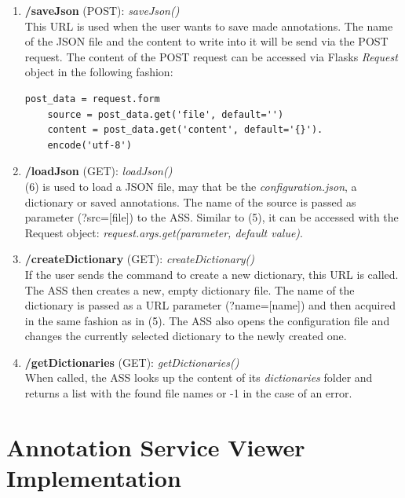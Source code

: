 \begin{enumerate}[(1) -]
	\item \textbf{/saveJson} (POST): \emph{saveJson()}\\
	This URL is used when the user wants to save made annotations. The name of the JSON file and the content to write into it will be send via the POST request. The content of the POST request can be accessed via Flasks \emph{Request} object\cite{web:flask} in the following fashion:
	\begin{lstlisting}[frame=single]
	post_data = request.form
	source = post_data.get('file', default='')
	content = post_data.get('content', default='{}').
	encode('utf-8')
	\end{lstlisting}
	
	\item \textbf{/loadJson} (GET): \emph{loadJson()}\\
	(6) is used to load a JSON file, may that be the \emph{configuration.json}, a dictionary or saved annotations. The name of the source is passed as parameter (?src=[file]) to the ASS. Similar to (5), it can be accessed with the Request object\cite{web:flask}: \emph{request.args.get(parameter, default value)}.
	
	\item \textbf{/createDictionary} (GET): \emph{createDictionary()}\\
	If the user sends the command to create a new dictionary, this URL is called. The ASS then creates a new, empty dictionary file. The name of the dictionary is passed as a URL parameter (?name=[name]) and then acquired in the same fashion as in (5). The ASS also opens the configuration file and changes the currently selected dictionary to the newly created one.
	
	\item \textbf{/getDictionaries} (GET): \emph{getDictionaries()}\\
	When called, the ASS looks up the content of its \emph{dictionaries} folder and returns a list with the found file names or -1 in the case of an error.
\end{enumerate}


\section{Annotation Service Viewer Implementation}
